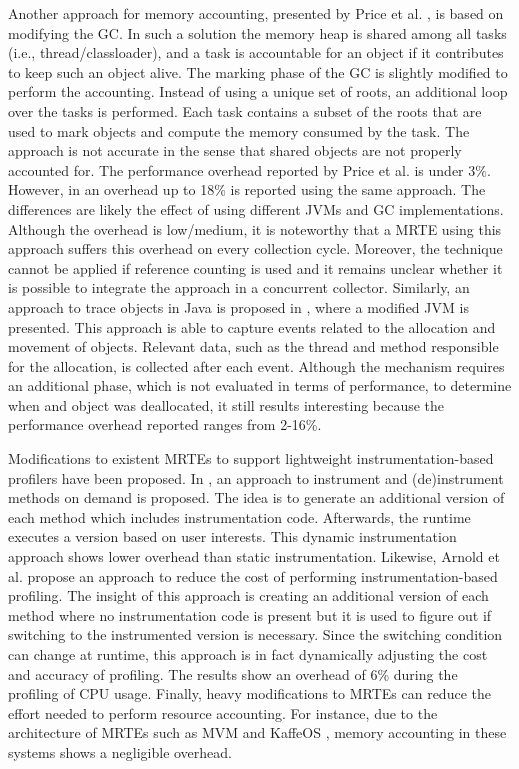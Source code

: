 Another approach for memory accounting, presented by Price et al. \cite{Price:2003:GCM:829515.830545}, is based on modifying the GC.
In such a solution the memory heap is shared among all tasks (i.e., thread/classloader), and a task is accountable for an object if it contributes to keep such an object alive.
The marking phase of the GC is slightly modified to perform the accounting.
Instead of using a unique set of roots, an additional loop over the tasks is performed.
Each task contains a subset of the roots that are used to mark objects and compute the memory consumed by the task.
The approach is not accurate in the sense that shared objects are not properly accounted for.
The performance overhead reported by Price et al. \cite{Price:2003:GCM:829515.830545} is under 3$\%$.
However, in \cite{dsn/09/geoffray/ijvm} an overhead up to 18\% is reported using the same approach.
The differences are likely the effect of using different JVMs and GC implementations.
Although the overhead is low/medium, it is noteworthy that a MRTE using this approach suffers this overhead on every collection cycle.
Moreover, the technique cannot be applied if reference counting is used and it remains unclear whether it is possible to integrate the approach in a concurrent collector.
Similarly, an approach to trace objects in Java is proposed in \cite{Lengauer:2015:AEO:2668930.2688037}, where a modified JVM is presented.
This approach is able to capture events related to the allocation and movement of objects.
Relevant data, such as the thread and method responsible for the allocation, is collected after each event.
Although the mechanism requires an additional phase, which is not evaluated in terms of performance, to determine when and object was deallocated, it still results interesting because the performance overhead reported ranges from 2-16\%.

Modifications to existent MRTEs to support lightweight instrumentation-based profilers have been proposed.
In \cite{Dmitriev:2004:PJA:974043.974067}, an approach to instrument and (de)instrument methods on demand is proposed.
The idea is to generate an additional version of each method which includes instrumentation code.
Afterwards, the runtime executes a version based on user interests.
This dynamic instrumentation approach shows lower overhead than static instrumentation.
Likewise, Arnold et al. \cite{citeulike:481405} propose an approach to reduce the cost of performing instrumentation-based profiling.
The insight of this approach is creating an additional version of each method where no instrumentation code is present but it is used to figure out if switching to the instrumented version is necessary.
Since the switching condition can change at runtime, this approach is in fact dynamically adjusting the cost and accuracy of profiling.
The results show an overhead of 6\% during the profiling of CPU usage.
Finally, heavy modifications to MRTEs can reduce the effort needed to perform resource accounting.
For instance, due to the architecture of MRTEs such as MVM \cite{czajkowski_multitasking_2001} and KaffeOS \cite{back_processes_2000}, memory accounting in these systems shows a negligible overhead.

